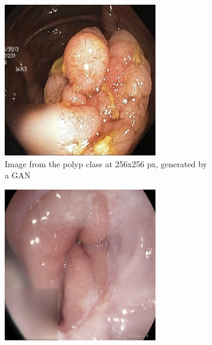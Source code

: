 \begin{figure}
\begin{subfigure}[t]{0.4\textwidth}
            \includegraphics[width=\textwidth]{experiments/figures/greensquare/polypGAN.png}
            \caption{Image from the polyp class at 256x256 px, generated by a GAN }   
            \label{fig:polyp_GAN_SQUARE1}
        \end{subfigure}
        \qquad\vfill%
        \begin{subfigure}[t]{0.4\textwidth}   
            \centering 
            \includegraphics[width=\textwidth]{experiments/figures/greensquare/zAE.png}

\end{subfigure}
\end{figure}
